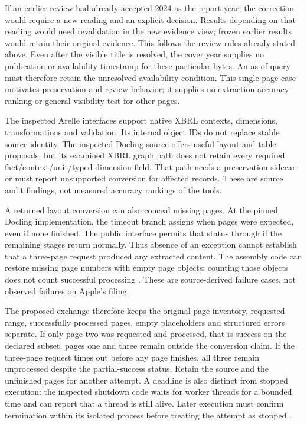 \begingroup
{}
If an earlier review had already accepted 2024 as the report year, the correction
would require a new reading and an explicit  decision. Results
depending on that reading would need revalidation in the new evidence view;
frozen earlier results would retain their original evidence. This follows the
review rules already stated above. Even after the visible title is resolved,
the cover year supplies no publication or availability timestamp for these
particular bytes. An as-of query must therefore retain the unresolved
availability condition. This single-page case motivates preservation and review
behavior; it supplies no extraction-accuracy ranking or general visibility
test for other pages.
\par\endgroup


The inspected Arelle interfaces support native XBRL contexts, dimensions,
transformations and validation. Its internal object IDs do not replace stable
source identity. The inspected Docling source offers useful layout and table
proposals, but its examined XBRL graph path does not retain every required
fact/context/unit/typed-dimension field. That path needs a preservation sidecar
or must report unsupported conversion for affected records. These are source
audit findings, not measured accuracy rankings of the tools.

A returned layout conversion can also conceal missing pages. At the pinned
Docling implementation, the timeout branch assigns 
when pages were expected, even if none finished. The public 
interface permits that status through  if the
remaining stages return normally. Thus absence of an exception cannot establish
that a three-page request produced any extracted content. The assembly code
can restore missing page numbers with empty page objects; counting those objects
does not count successful processing \citep{doclingpinned2026}. These are
source-derived failure cases, not observed failures on Apple's filing.

The proposed exchange therefore keeps the original page inventory, requested
range, successfully processed pages, empty placeholders and structured errors
separate. If only page two was requested and processed, that is success on the
declared subset; pages one and three remain outside the conversion claim. If
the three-page request times out before any page finishes, all three remain
unprocessed despite the partial-success status. Retain the source and the
unfinished pages for another attempt. A deadline is also distinct from stopped
execution: the inspected shutdown code waits for worker threads for a bounded
time and can report that a thread is still alive. Later execution must confirm
termination within its isolated process before treating the attempt as stopped
\citep{doclingpinned2026}.

